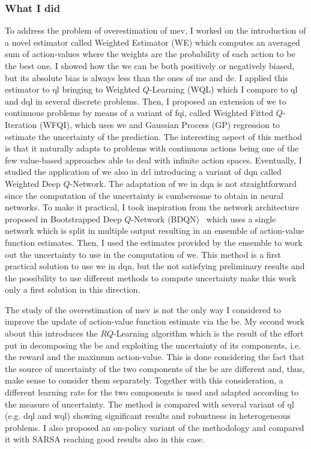 \subsubsection{What I did}
To address the problem of overestimation of \gls{mev}, I worked on the introduction of a novel estimator called Weighted Estimator (WE) which computes an averaged sum of action-values where the weights are the probability of each action to be the best one. I showed how the \gls{we} can be both positively or negatively biased, but its absolute bias is always less than the ones of \gls{me} and \gls{de}. I applied this estimator to \gls{ql} bringing to Weighted $Q$-Learning (WQL) which I compare to \gls{ql} and \gls{dql} in several discrete problems. Then, I proposed an extension of \gls{we} to continuous problems by means of a variant of \gls{fqi}, called Weighted Fitted $Q$-Iteration (WFQI), which uses \gls{we} and Gaussian Process (GP) regression to estimate the uncertainty of the prediction. The interesting aspect of this method is that it naturally adapts to problems with continuous actions being one of the few value-based approaches able to deal with infinite action spaces. Eventually, I studied the application of \gls{we} also in \gls{drl} introducing a variant of \gls{dqn} called Weighted Deep $Q$-Network. The adaptation of \gls{we} in \gls{dqn} is not straightforward since the computation of the uncertainty is cumbersome to obtain in neural networks. To make it practical, I took inspiration from the network architecture proposed in Bootstrapped Deep $Q$-Network (BDQN)~\cite{osband2017deep} which uses a single network which is split in multiple output resulting in an ensemble of action-value function estimates. Then, I used the estimates provided by the ensemble to work out the uncertainty to use in the computation of \gls{we}. This method is a first practical solution to use \gls{we} in \gls{dqn}, but the not satisfying preliminary results and the possibility to use different methods to compute uncertainty make this work only a first solution in this direction.

The study of the overestimation of \gls{mev} is not the only way I considered to improve the update of action-value function estimate via the \gls{be}. My second work about this introduces the $RQ$-Learning algorithm which is the result of the effort put in decomposing the \gls{be} and exploiting the uncertainty of its components, i.e. the reward and the maximum action-value. This is done considering the fact that the source of uncertainty of the two components of the \gls{be} are different and, thus, make sense to consider them separately. Together with this consideration, a different learning rate for the two components is used and adapted according to the measure of uncertainty. The method is compared with several variant of \gls{ql} (e.g. \gls{dql} and \gls{wql}) showing significant results and robustness in heterogeneous problems. I also proposed an on-policy variant of the methodology and compared it with SARSA reaching good results also in this case.

